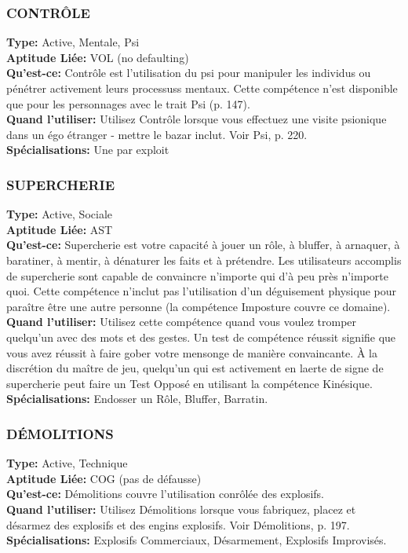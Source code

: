 \subsubsection{CONTRÔLE}
\textbf{Type:} Active, Mentale, Psi \\
\textbf{Aptitude Liée:} VOL (no defaulting)\\
\textbf{Qu'est-ce:} Contrôle est l'utilisation du psi pour manipuler les individus ou pénétrer activement leurs processuss mentaux. Cette compétence n'est disponible que pour les personnages avec le trait Psi (p. 147). \\
\textbf{Quand l'utiliser:} Utilisez Contrôle lorsque vous effectuez une visite psionique dans un égo étranger - mettre le bazar inclut. Voir Psi, p. 220. \\
\textbf{Spécialisations:} Une par exploit 

\subsubsection{SUPERCHERIE} \textbf{Type:} Active, Sociale \\ \textbf{Aptitude Liée:} AST \\ \textbf{Qu'est-ce:} Supercherie est votre capacité à jouer un rôle, à bluffer, à arnaquer, à baratiner, à mentir, à dénaturer les faits et à prétendre. Les utilisateurs accomplis de supercherie sont capable de convaincre n'importe qui d'à peu près n'importe quoi. Cette compétence n'inclut pas l'utilisation d'un déguisement physique pour paraître être une autre personne (la compétence Imposture couvre ce domaine). \\ \textbf{Quand l'utiliser:} Utilisez cette compétence quand vous voulez tromper quelqu'un avec des mots et des gestes. Un test de compétence réussit signifie que vous avez réussit à faire gober votre mensonge de manière convaincante. À la discrétion du maître de jeu, quelqu'un qui est activement en laerte de signe de supercherie peut faire un Test Opposé en utilisant la compétence Kinésique. \\ \textbf{Spécialisations:} Endosser un Rôle, Bluffer, Barratin. 

\subsubsection{DÉMOLITIONS} \textbf{Type:} Active, Technique\\ \textbf{Aptitude Liée:} COG (pas de défausse) \\ \textbf{Qu'est-ce:} Démolitions couvre l'utilisation conrôlée des explosifs. \\ \textbf{Quand l'utiliser:} Utilisez Démolitions lorsque vous fabriquez, placez et désarmez des explosifs et des engins explosifs. Voir Démolitions, p. 197. \\ \textbf{Spécialisations:} Explosifs Commerciaux, Désarmement, Explosifs Improvisés. 

